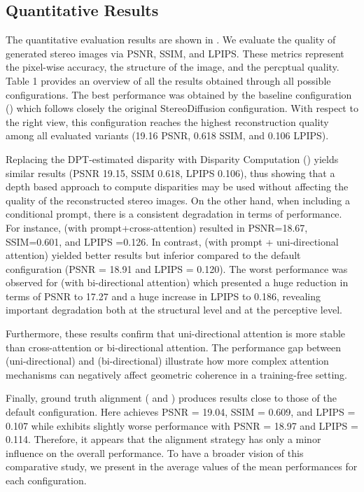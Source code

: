 \subsection{Quantitative Results}\label{quantitative_results}
The quantitative evaluation results are shown in . We evaluate the quality of generated stereo images via PSNR, SSIM, and LPIPS. These metrics represent the pixel-wise accuracy, the structure of the image, and the percptual quality. Table 1 provides an overview of all the results obtained through all possible configurations. The best performance was obtained by the baseline configuration () which follows closely the original StereoDiffusion configuration. With respect to the right view, this configuration reaches the highest reconstruction quality among all evaluated variants (19.16 PSNR, 0.618 SSIM, and 0.106 LPIPS).

Replacing the DPT-estimated disparity with Disparity Computation () yields similar results (PSNR 19.15, SSIM 0.618, LPIPS 0.106), thus showing that a depth based approach to compute disparities may be used without affecting the quality of the reconstructed stereo images. On the other hand, when including a conditional prompt, there is a consistent degradation in terms of performance. For instance,  (with prompt+cross-attention) resulted in PSNR=18.67, SSIM=0.601, and LPIPS =0.126. In contrast,  (with prompt + uni-directional attention) yielded better results but inferior compared to the default configuration (PSNR = 18.91 and LPIPS = 0.120). The worst performance was observed for  (with bi-directional attention) which presented a huge reduction in terms of PSNR to 17.27 and a huge increase in LPIPS to 0.186, revealing important degradation both at the structural level and at the perceptive level.

Furthermore, these results confirm that uni-directional attention is more stable than cross-attention or bi-directional attention. The performance gap between  (uni-directional) and  (bi-directional) illustrate how more complex attention mechanisms can negatively affect geometric coherence in a training-free setting.

Finally, ground truth alignment ( and ) produces results close to those of the default configuration. Here  achieves PSNR = 19.04, SSIM = 0.609, and LPIPS = 0.107 while  exhibits slightly worse performance with PSNR = 18.97 and LPIPS = 0.114. Therefore, it appears that the alignment strategy has only a minor influence on the overall performance.
To have a broader vision of this comparative study, we present in  the average values of the mean performances for each configuration.

